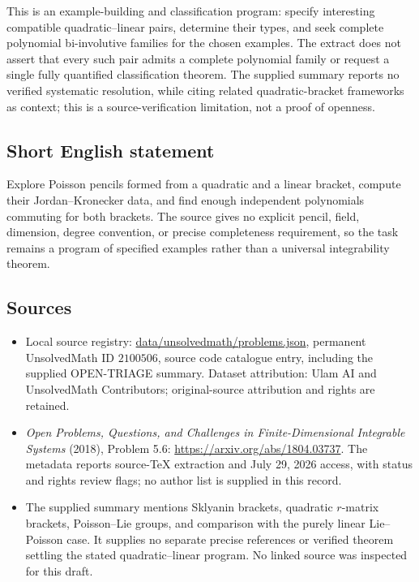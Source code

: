 \documentclass[11pt]{article}
\begin{document}
This is an example-building and classification program: specify interesting compatible quadratic--linear pairs, determine their types, and seek complete polynomial bi-involutive families for the chosen examples. The extract does not assert that every such pair admits a complete polynomial family or request a single fully quantified classification theorem. The supplied summary reports no verified systematic resolution, while citing related quadratic-bracket frameworks as context; this is a source-verification limitation, not a proof of openness.
\subsection{Short English statement}
Explore Poisson pencils formed from a quadratic and a linear bracket, compute their Jordan--Kronecker data, and find enough independent polynomials commuting for both brackets. The source gives no explicit pencil, field, dimension, degree convention, or precise completeness requirement, so the task remains a program of specified examples rather than a universal integrability theorem.
\subsection{Sources}
\begin{itemize}
\item Local source registry: \url{data/unsolvedmath/problems.json}, permanent UnsolvedMath ID $2100506$, source code catalogue entry, including the supplied OPEN-TRIAGE summary. Dataset attribution: Ulam AI and UnsolvedMath Contributors; original-source attribution and rights are retained.
\item \emph{Open Problems, Questions, and Challenges in Finite-Dimensional Integrable Systems} (2018), Problem 5.6: \url{https://arxiv.org/abs/1804.03737}. The metadata reports source-TeX extraction and July 29, 2026 access, with status and rights review flags; no author list is supplied in this record.
\item The supplied summary mentions Sklyanin brackets, quadratic $r$-matrix brackets, Poisson--Lie groups, and comparison with the purely linear Lie--Poisson case. It supplies no separate precise references or verified theorem settling the stated quadratic--linear program. No linked source was inspected for this draft.
\end{itemize}
\end{document}
